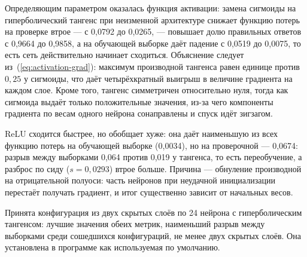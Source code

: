 Определяющим параметром оказалась функция активации: замена сигмоиды на
гиперболический тангенс при неизменной архитектуре снижает функцию потерь на проверке
втрое --- с 0,0792 до 0,0265, --- повышает долю правильных ответов с 0,9664 до 0,9858, а
на обучающей выборке даёт падение с 0,0519 до 0,0075, то есть сеть действительно начинает
сходиться. Объяснение следует из~(\ref{eq:activation-grad}): максимум производной
тангенса равен единице против $0{,}25$ у сигмоиды, что даёт четырёхкратный выигрыш в
величине градиента на каждом слое. Кроме того, тангенс симметричен относительно нуля,
тогда как сигмоида выдаёт только положительные значения, из-за чего компоненты градиента
по весам одного нейрона сонаправлены и спуск идёт зигзагом.

ReLU сходится быстрее, но обобщает хуже: она даёт наименьшую из всех функцию
потерь на обучающей выборке (0,0034), но на проверочной --- 0,0674: разрыв между
выборками 0,064 против 0,019 у тангенса, то есть переобучение, а разброс по сиду
($s = 0{,}0293$) втрое больше. Причина --- обнуление производной на отрицательной
полуоси: часть нейронов при неудачной инициализации перестаёт получать градиент, и итог
существенно зависит от начальных весов.

Принята конфигурация из двух скрытых слоёв по 24 нейрона с
гиперболическим тангенсом: лучшие значения обеих метрик, наименьший разрыв между
выборками среди сошедшихся конфигураций, не менее двух скрытых слоёв. Она установлена в
программе как используемая по умолчанию.
